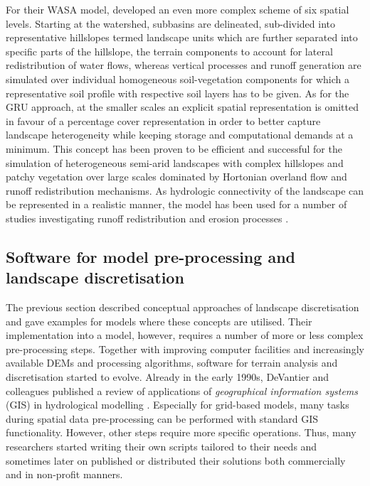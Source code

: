 For their WASA model, \citet{Guentner2004b} developed an even more complex scheme of six spatial levels.
Starting at the watershed, subbasins are delineated, sub-divided into representative hillslopes termed landscape units which are further separated into specific parts of the hillslope, the terrain components to account for lateral redistribution of water flows, whereas vertical processes and runoff generation are simulated over individual homogeneous soil-vegetation components for which a representative soil profile with respective soil layers has to be given.
As for the GRU approach, at the smaller scales an explicit spatial representation is omitted in favour of a percentage cover representation in order to better capture landscape heterogeneity while keeping storage and computational demands at a minimum.
This concept has been proven to be efficient and successful for the simulation of heterogeneous semi-arid landscapes with complex hillslopes and patchy vegetation over large scales dominated by Hortonian overland flow and runoff redistribution mechanisms.
As hydrologic connectivity of the landscape can be represented in a realistic manner, the model has been used for a number of studies investigating runoff redistribution and erosion processes \citep[e.g.,][]{Guentner2004b,Mueller2010,Medeiros2010,Bronstert2014}.


\subsection{Software for model pre-processing and landscape discretisation}
\label{sec:review_software}
The previous section described conceptual approaches of landscape discretisation and gave examples for models where these concepts are utilised.
Their implementation into a model, however, requires a number of more or less complex pre-processing steps.
Together with improving computer facilities and increasingly available DEMs and processing algorithms, software for terrain analysis and discretisation started to evolve.
Already in the early 1990s, DeVantier and colleagues published a review of applications of \emph{geographical information systems} (GIS) in hydrological modelling \citep{DeVantier1993}.
Especially for grid-based models, many tasks during spatial data pre-processing can be performed with standard GIS functionality.
However, other steps require more specific operations.
Thus, many researchers started writing their own scripts tailored to their needs and sometimes later on published or distributed their solutions both commercially and in non-profit manners.

